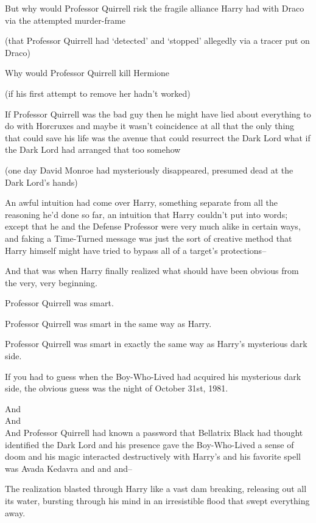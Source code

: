 But why would Professor Quirrell risk the fragile alliance Harry had with Draco via the attempted murder-frame

(that Professor Quirrell had `detected' and `stopped' allegedly via a tracer put on Draco)

Why would Professor Quirrell kill Hermione

(if his first attempt to remove her hadn't worked)

If Professor Quirrell was the bad guy then he might have lied about everything to do with Horcruxes and maybe it wasn't coincidence at all that the only thing that could save his life was the avenue that could resurrect the Dark Lord what if the Dark Lord had arranged that too somehow

(one day David Monroe had mysteriously disappeared, presumed dead at the Dark Lord's hands)

An awful intuition had come over Harry, something separate from all the reasoning he'd done so far, an intuition that Harry couldn't put into words; except that he and the Defense Professor were very much alike in certain ways, and faking a Time-Turned message was just the sort of creative method that Harry himself might have tried to bypass all of a target's protections\---

And that was when Harry finally realized what should have been obvious from the very, very beginning.

\later

Professor Quirrell was smart.

Professor Quirrell was smart in the same way as Harry.

Professor Quirrell was smart in exactly the same way as Harry's mysterious dark side.

If you had to guess when the Boy-Who-Lived had acquired his mysterious dark side, the obvious guess was the night of October 31st, 1981.

\later

\noindent And\\
And\\
And Professor Quirrell had known a password that Bellatrix Black had thought identified the Dark Lord and his presence gave the Boy-Who-Lived a sense of doom and his magic interacted destructively with Harry's and his favorite spell was Avada Kedavra and and and\---

The realization blasted through Harry like a vast dam breaking, releasing out all its water, bursting through his mind in an irresistible flood that swept everything away.


